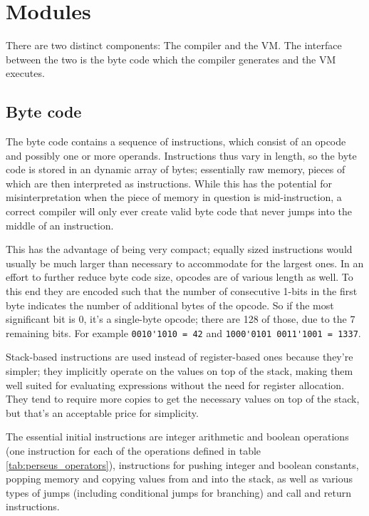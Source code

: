 	
	\section{Modules}
	
		
		There are two distinct components: The compiler and the VM. The interface between the two is the byte code which the compiler generates and the VM executes.
		
		\subsection{Byte code}
			
			The byte code contains a sequence of instructions, which consist of an opcode and possibly one or more operands. Instructions thus vary in length, so the byte code is stored in an dynamic array of bytes; essentially raw memory, pieces of which are then interpreted as instructions. While this has the potential for misinterpretation when the piece of memory in question is mid-instruction, a correct compiler will only ever create valid byte code that never jumps into the middle of an instruction.
			
			This has the advantage of being very compact; equally sized instructions would usually be much larger than necessary to accommodate for the largest ones. In an effort to further reduce byte code size, opcodes are of various length as well. To this end they are encoded such that the number of consecutive 1-bits in the first byte indicates the number of additional bytes of the opcode. So if the most significant bit is 0, it's a single-byte opcode; there are 128 of those, due to the 7 remaining bits. For example \lstinline$0010'1010 = 42$ and \lstinline$1000'0101 0011'1001 = 1337$.
			
			Stack-based instructions are used instead of register-based ones because they're simpler; they implicitly operate on the values on top of the stack, making them well suited for evaluating expressions without the need for register allocation. They tend to require more copies to get the necessary values on top of the stack, but that's an acceptable price for simplicity.
			
			The essential initial instructions are integer arithmetic and boolean operations (one instruction for each of the operations defined in table \ref{tab:perseus_operators}), instructions for pushing integer and boolean constants, popping memory and copying values from and into the stack, as well as various types of jumps (including conditional jumps for branching) and call and return instructions.
		
